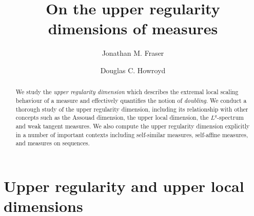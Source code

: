 \documentclass[12pt]{amsart}
\numberwithin{equation}{section}
\begin{document}
\title[Upper regularity dimensions]{On the upper regularity dimensions of measures}


\author[J. M. Fraser]{Jonathan M. Fraser}
\address{Jonathan M. Fraser\\
School of Mathematics \& Statistics\\University of St Andrews\\ St Andrews\\ KY16 9SS\\ UK  }
\curraddr{}


\author[D. C. Howroyd]{ Douglas C. Howroyd}
\address{Douglas C. Howroyd\\
School of Mathematics \& Statistics\\University of St Andrews\\ St Andrews\\ KY16 9SS\\ UK  }
\curraddr{}








\begin{abstract}
We study the \emph{upper regularity dimension} which describes the extremal local scaling behaviour of a measure and effectively quantifies the notion of \emph{doubling}. We conduct a thorough study of the upper regularity dimension, including its relationship with other  concepts  such as the Assouad dimension, the upper local dimension,  the $L^q$-spectrum and weak tangent measures.   We also compute the upper regularity dimension explicitly in a number of important contexts including self-similar measures, self-affine measures, and measures on sequences. 
\end{abstract}


\maketitle









\section{Upper regularity and upper local dimensions} \label{intro}\label{dimension}
\end{document}

